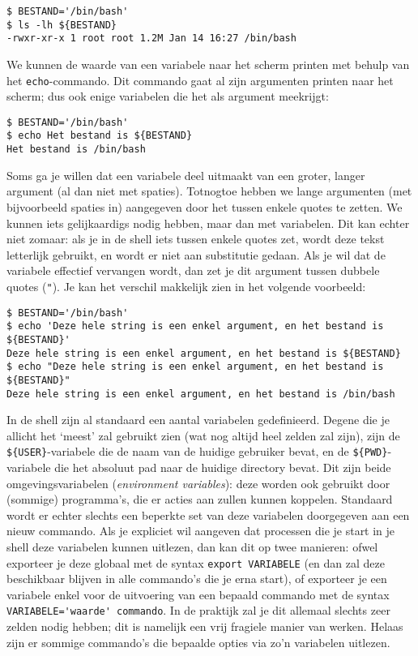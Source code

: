 \documentclass[a4paper,twoside,openany]{memoir}
\begin{document}
\begin{verbatim}
$ BESTAND='/bin/bash'
$ ls -lh ${BESTAND}
-rwxr-xr-x 1 root root 1.2M Jan 14 16:27 /bin/bash
\end{verbatim}

We kunnen de waarde van een variabele naar het scherm printen met behulp van
het \verb!echo!-commando. Dit commando gaat al zijn argumenten printen naar het
scherm; dus ook enige variabelen die het als argument meekrijgt:
\begin{verbatim}
$ BESTAND='/bin/bash'
$ echo Het bestand is ${BESTAND}
Het bestand is /bin/bash
\end{verbatim}

Soms ga je willen dat een variabele deel uitmaakt van een groter, langer
argument (al dan niet met spaties). Totnogtoe hebben we lange argumenten (met
bijvoorbeeld spaties in) aangegeven door het tussen enkele quotes te zetten. We
kunnen iets gelijkaardigs nodig hebben, maar dan met variabelen. Dit kan echter
niet zomaar: als je in de shell iets tussen enkele quotes zet, wordt deze tekst
letterlijk gebruikt, en wordt er niet aan substitutie gedaan. Als je wil dat de
variabele effectief vervangen wordt, dan zet je dit argument tussen dubbele
quotes (\verb!"!). Je kan het verschil makkelijk zien in het volgende
voorbeeld:

\begin{verbatim}
$ BESTAND='/bin/bash'
$ echo 'Deze hele string is een enkel argument, en het bestand is ${BESTAND}'
Deze hele string is een enkel argument, en het bestand is ${BESTAND}
$ echo "Deze hele string is een enkel argument, en het bestand is ${BESTAND}"
Deze hele string is een enkel argument, en het bestand is /bin/bash
\end{verbatim}

In de shell zijn al standaard een aantal variabelen gedefinieerd. Degene die je
allicht het `meest' zal gebruikt zien (wat nog altijd heel zelden zal zijn),
zijn de \verb!${USER}!-variabele die de naam van de huidige gebruiker bevat, en
de \verb!${PWD}!-variabele die het absoluut pad naar de huidige directory
bevat. Dit zijn beide omgevingsvariabelen (\emph{environment variables}): deze
worden ook gebruikt door (sommige) programma's, die er acties aan zullen kunnen
koppelen. Standaard wordt er echter slechts een beperkte set van deze
variabelen doorgegeven aan een nieuw commando. Als je expliciet wil aangeven
dat processen die je start in je shell deze variabelen kunnen uitlezen, dan kan
dit op twee manieren: ofwel exporteer je deze globaal met de syntax
\verb!export VARIABELE! (en dan zal deze beschikbaar blijven in alle commando's
die je erna start), of exporteer je een variabele enkel voor de uitvoering van
een bepaald commando met de syntax \verb!VARIABELE='waarde' commando!. In de
praktijk zal je dit allemaal slechts zeer zelden nodig hebben; dit is namelijk
een vrij fragiele manier van werken. Helaas zijn er sommige commando's die
bepaalde opties via zo'n variabelen uitlezen.
\end{document}
